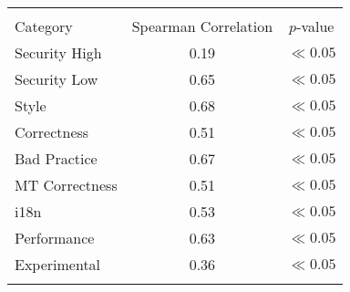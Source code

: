 
\begin{tabular}{lcc}
\hline \\
Category & Spearman Correlation & $p$-value \\ \hline 
Security High & 0.19 & $\ll 0.05$\\
Security Low & 0.65 & $\ll 0.05$\\
Style & 0.68 & $\ll 0.05$\\
Correctness & 0.51 & $\ll 0.05$\\
Bad Practice & 0.67 & $\ll 0.05$\\
MT Correctness & 0.51 & $\ll 0.05$\\
i18n & 0.53 & $\ll 0.05$\\
Performance & 0.63 & $\ll 0.05$\\
Experimental & 0.36 & $\ll 0.05$\\
\hline \\
\end{tabular}
